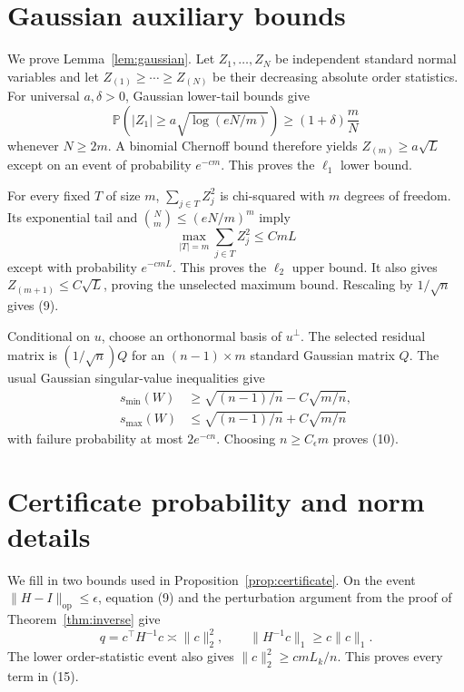 \documentclass[twoside]{article}
\newcommand{\Prob}{\mathbb P}
\begin{document}


\appendix
\thispagestyle{empty}
\onecolumn

\section{Gaussian auxiliary bounds}
\label{app:gaussian}

We prove Lemma~\ref{lem:gaussian}. Let $Z_1,\ldots,Z_N$ be independent standard normal variables and let $Z_{(1)}\geq\cdots\geq Z_{(N)}$ be their decreasing absolute order statistics. For universal $a,\delta>0$, Gaussian lower-tail bounds give \[ \Prob(|Z_1|\geq a\sqrt{\log(eN/m)}) \geq(1+\delta)\frac{m}{N} \] whenever $N\geq2m$. A binomial Chernoff bound therefore yields $Z_{(m)}\geq a\sqrt{L}$ except on an event of probability $e^{-cm}$. This proves the $\ell_1$ lower bound.

For every fixed $T$ of size $m$, $\sum_{j\in T}Z_j^2$ is chi-squared with $m$ degrees of freedom. Its exponential tail and $\binom Nm\leq(eN/m)^m$ imply \[ \max_{|T|=m}\sum_{j\in T}Z_j^2\leq CmL \] except with probability $e^{-cmL}$. This proves the $\ell_2$ upper bound. It also gives $Z_{(m+1)}\leq C\sqrt L$, proving the unselected maximum bound. Rescaling by $1/\sqrt n$ gives (9).

Conditional on $u$, choose an orthonormal basis of $u^\perp$. The selected residual matrix is $(1/\sqrt n)Q$ for an $(n-1)\times m$ standard Gaussian matrix $Q$. The usual Gaussian singular-value inequalities give
\begin{align*}
 s_{\min}(W)&\geq\sqrt{(n-1)/n}-C\sqrt{m/n},\\
 s_{\max}(W)&\leq\sqrt{(n-1)/n}+C\sqrt{m/n}
\end{align*}
with failure probability at most $2e^{-cn}$. Choosing $n\geq C_\epsilon m$ proves (10).

\section{Certificate probability and norm details}
\label{app:certificate}

We fill in two bounds used in Proposition~\ref{prop:certificate}. On the event $\|H-I\|_{\mathrm{op}}\leq\epsilon$, equation (9) and the perturbation argument from the proof of Theorem~\ref{thm:inverse} give \[ q=c^\top H^{-1}c\asymp\|c\|_2^2, \qquad \|H^{-1}c\|_1\geq c\|c\|_1. \] The lower order-statistic event also gives $\|c\|_2^2\geq cmL_k/n$. This proves every term in (15).
\end{document}
